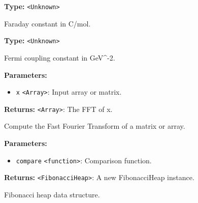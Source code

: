 \documentclass[12pt,a4paper]{article}
\begin{document}
\vspace{5mm}
\noindent {}\vspace{4mm}


\noindent \textbf{Type:} \texttt{<Unknown>}

\noindent Faraday constant in C/mol.

\vspace{5mm}
\noindent {}\vspace{4mm}


\noindent \textbf{Type:} \texttt{<Unknown>}

\noindent Fermi coupling constant in GeV\textasciicircum{}-2.

\vspace{5mm}
\noindent {}


\noindent \textbf{Parameters:}
\begin{itemize}
  \item \texttt{x} \texttt{<Array>}: Input array or matrix.
\end{itemize}

\noindent \textbf{Returns:} \texttt{<Array>}: The FFT of x.

\noindent Compute the Fast Fourier Transform of a matrix or array.

\vspace{5mm}
\noindent {}


\noindent \textbf{Parameters:}
\begin{itemize}
  \item \texttt{compare} \texttt{<function>}: Comparison function.
\end{itemize}

\noindent \textbf{Returns:} \texttt{<FibonacciHeap>}: A new FibonacciHeap instance.

\noindent Fibonacci heap data structure.

\vspace{5mm}
\noindent {}
\end{document}
